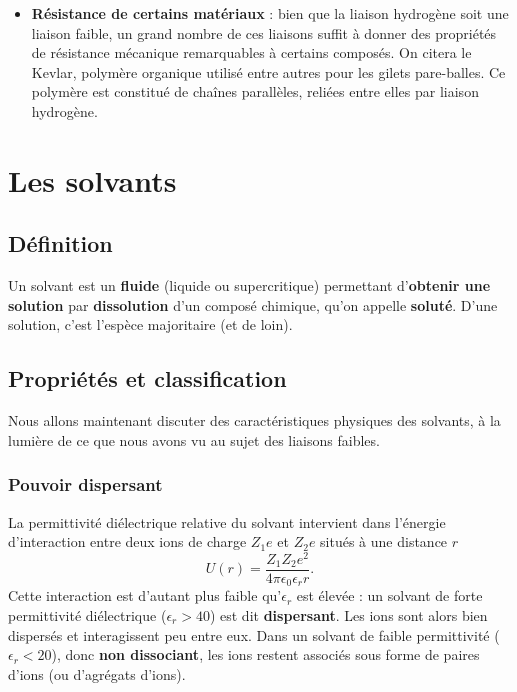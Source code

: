\documentclass[11pt,a4paper]{report}
\begin{document}
\begin{itemize}
	\item \textbf{Résistance de certains matériaux} : bien que la liaison hydrogène soit une liaison 	faible, un grand nombre de ces liaisons suffit à donner des propriétés de résistance mécanique 			remarquables à certains composés. On citera le Kevlar, polymère organique utilisé entre autres 			pour les gilets pare-balles. Ce polymère est constitué de chaînes parallèles, reliées entre 			elles par liaison hydrogène.
\end{itemize}

\newpage
\section{Les solvants}\label{sec:2}

\subsection{Définition}

Un solvant est un \textbf{fluide} (liquide ou supercritique) permettant d'\textbf{obtenir une solution} par \textbf{dissolution} d'un composé chimique, qu'on appelle \textbf{soluté}. D'une solution, c'est l'espèce majoritaire (et de loin).

\subsection{Propriétés et classification}

Nous allons maintenant discuter des caractéristiques physiques des solvants, à la lumière de ce que nous avons vu au sujet des liaisons faibles.

\subsubsection{Pouvoir dispersant}

La permittivité diélectrique relative du solvant intervient dans l'énergie d'interaction entre deux ions de charge $Z_1e$ et $Z_2e$ situés à une distance $r$
\begin{equation}
	U(r) = \frac{Z_1 Z_2 e^2}{4\pi\epsilon_0 \epsilon_r r}.
\end{equation}
Cette interaction est d'autant plus faible qu'$\epsilon_r$ est élevée : un solvant de forte permittivité diélectrique ($\epsilon_r > 40$) est dit \textbf{dispersant}. Les ions sont alors bien dispersés et interagissent peu entre eux. Dans un solvant de faible permittivité ($\epsilon_r < 20$), donc \textbf{non dissociant}, les ions restent associés sous forme de paires d'ions (ou d'agrégats d'ions).
\end{document}
